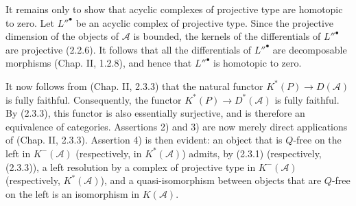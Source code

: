 It remains only to show that acyclic complexes of projective type are
homotopic to zero. Let ${L''}^\bullet$ be an acyclic complex of projective
type. Since the projective dimension of the objects of $\mathcal A$ is
bounded, the kernels of the differentials of ${L''}^\bullet$ are
projective (2.2.6). It follows that all the differentials of
${L''}^\bullet$ are decomposable morphisms (Chap. II, 1.2.8), and hence
that ${L''}^\bullet$ is homotopic to zero.

It now follows from (Chap. II, 2.3.3) that the natural functor
$K^{*}(P)\longrightarrow D(\mathcal A)$ is fully faithful. Consequently,
the functor $K^{*}(P)\longrightarrow D^{*}(\mathcal A)$ is fully faithful.
By (2.3.3), this functor is also essentially surjective, and is therefore
an equivalence of categories. Assertions 2) and 3) are now merely direct
applications of (Chap. II, 2.3.3). Assertion 4) is then evident: an object
that is $Q$-free on the left in $K^{-}(\mathcal A)$ (respectively, in
$K^{*}(\mathcal A)$) admits, by (2.3.1) (respectively, (2.3.3)), a left
resolution by a complex of projective type in $K^{-}(\mathcal A)$
(respectively, $K^{*}(\mathcal A)$), and a quasi-isomorphism between
objects that are $Q$-free on the left is an isomorphism in $K(\mathcal A)$.
\endgroup
